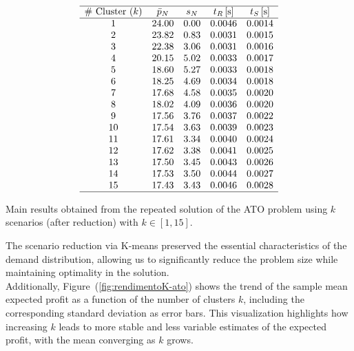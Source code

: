 \documentclass[a4paper,12pt]{article}
\begin{document}
	\begin{table}
		
	\[
	\begin{array}{ccccc}
		\hline
		\text{\# Cluster $(k)$} & \text{$\bar{p}_{N}$} & \text{$s_{N}$} & \text{$t_{R}$\,[s]} & \text{$t_{S}$\,[s]} \\
		\hline
		1  & 24.00 & 0.00 & 0.0046 & 0.0014 \\
		2  & 23.82 & 0.83 & 0.0031 & 0.0015 \\
		3  & 22.38 & 3.06 & 0.0031 & 0.0016 \\
		4  & 20.15 & 5.02 & 0.0033 & 0.0017 \\
		5  & 18.60 & 5.27 & 0.0033 & 0.0018 \\
		6  & 18.25 & 4.69 & 0.0034 & 0.0018 \\
		7  & 17.68 & 4.58 & 0.0035 & 0.0020 \\
		8  & 18.02 & 4.09 & 0.0036 & 0.0020 \\
		9  & 17.56 & 3.76 & 0.0037 & 0.0022 \\
		10 & 17.54 & 3.63 & 0.0039 & 0.0023 \\
		11 & 17.61 & 3.34 & 0.0040 & 0.0024 \\
		12 & 17.62 & 3.38 & 0.0041 & 0.0025 \\
		13 & 17.50 & 3.45 & 0.0043 & 0.0026 \\
		14 & 17.53 & 3.50 & 0.0044 & 0.0027 \\
		15 & 17.43 & 3.43 & 0.0046 & 0.0028 \\
		\hline
	\end{array}
	\]
	\label{tab:kmeans-ato-results}
	\caption{Main results obtained from the repeated solution of the ATO problem using $k$ scenarios (after reduction) with $k \in [1,15]$.}
	\end{table}
	
	
	The scenario reduction via K-means preserved the essential characteristics of the demand distribution, allowing us to significantly reduce the problem size while maintaining optimality in the solution.	\\
	
	\noindent
	Additionally, Figure~(\ref{fig:rendimentoK-ato}) shows the trend of the sample mean expected profit as a function of the number of clusters $k$, including the corresponding standard deviation as error bars. This visualization highlights how increasing $k$ leads to more stable and less variable estimates of the expected profit, with the mean converging as $k$ grows.
	
\end{document}
